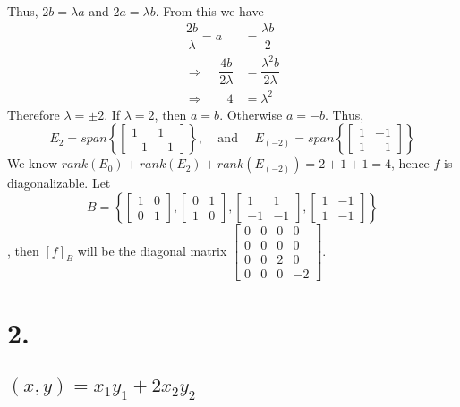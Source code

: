 \documentclass{article}
\begin{document}
Thus, $2b = \lambda a$ and $2a = \lambda b$. From this we have 
\begin{align*}
\dfrac{2b}{\lambda} = a & =\dfrac{ \lambda b}{2} \\
\Rightarrow  \ \ \ \ \ \dfrac{4b}{2 \lambda} &= \dfrac{\lambda^2 b}{2 \lambda} \\
\Rightarrow \ \ \  \ \ \ \ \ 4 &= \lambda^2
\end{align*}
Therefore $\lambda = \pm 2$. If $\lambda = 2$, then $a = b$. Otherwise $a = -b$. Thus, 
\[ E_2 = span \left \{ \begin{bmatrix}1&1\\-1&-1\end{bmatrix} \right \}, \ \ \ \ \ \text{and} \ \ \ \ \ \  E_{(-2)} = span \left \{ \begin{bmatrix}1&-1\\1&-1\end{bmatrix}\right \}\]
We know $rank(E_0) + rank(E_2) + rank(E_{(-2)}) =2 + 1 +1 = 4$, hence $f$ is diagonalizable. Let \[ B = \left \{ \begin{bmatrix}1&0\\0&1\end{bmatrix},\begin{bmatrix}0&1\\1&0\end{bmatrix}, \begin{bmatrix}1&1\\-1&-1\end{bmatrix} , \begin{bmatrix}1&-1\\1&-1\end{bmatrix}\right\} \]
, then $[f]_B$ will be the diagonal matrix $\begin{bmatrix}0&0&0&0\\0&0&0&0\\0&0&2&0\\0&0&0&-2\end{bmatrix}$.
\section*{2.}
\subsection{$(x,y) = x_1y_1+2x_2y_2$}
\end{document}
